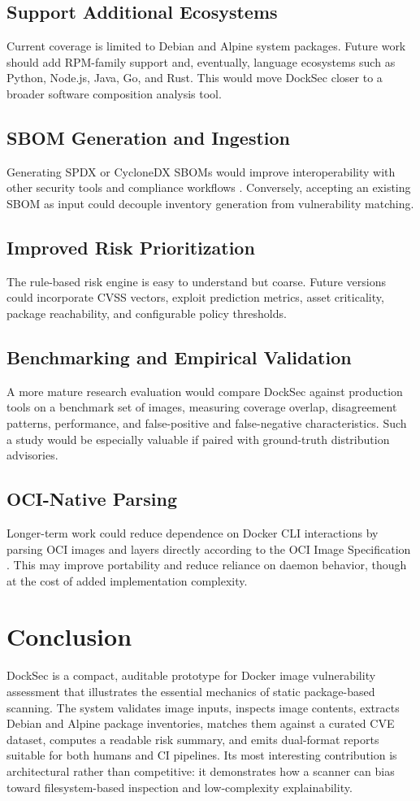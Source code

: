 \documentclass[12pt,draftclsnofoot,onecolumn]{IEEEtran}
\begin{document}
\subsection{Support Additional Ecosystems}
Current coverage is limited to Debian and Alpine system packages. Future work should add RPM-family support and, eventually, language ecosystems such as Python, Node.js, Java, Go, and Rust. This would move DockSec closer to a broader software composition analysis tool.

\subsection{SBOM Generation and Ingestion}
Generating SPDX or CycloneDX SBOMs would improve interoperability with other security tools and compliance workflows \cite{ntiasbom,spdxspec}. Conversely, accepting an existing SBOM as input could decouple inventory generation from vulnerability matching.

\subsection{Improved Risk Prioritization}
The rule-based risk engine is easy to understand but coarse. Future versions could incorporate CVSS vectors, exploit prediction metrics, asset criticality, package reachability, and configurable policy thresholds.

\subsection{Benchmarking and Empirical Validation}
A more mature research evaluation would compare DockSec against production tools on a benchmark set of images, measuring coverage overlap, disagreement patterns, performance, and false-positive and false-negative characteristics. Such a study would be especially valuable if paired with ground-truth distribution advisories.

\subsection{OCI-Native Parsing}
Longer-term work could reduce dependence on Docker CLI interactions by parsing OCI images and layers directly according to the OCI Image Specification \cite{ociimage}. This may improve portability and reduce reliance on daemon behavior, though at the cost of added implementation complexity.

\section{Conclusion}
DockSec is a compact, auditable prototype for Docker image vulnerability assessment that illustrates the essential mechanics of static package-based scanning. The system validates image inputs, inspects image contents, extracts Debian and Alpine package inventories, matches them against a curated CVE dataset, computes a readable risk summary, and emits dual-format reports suitable for both humans and CI pipelines. Its most interesting contribution is architectural rather than competitive: it demonstrates how a scanner can bias toward filesystem-based inspection and low-complexity explainability.
\end{document}
